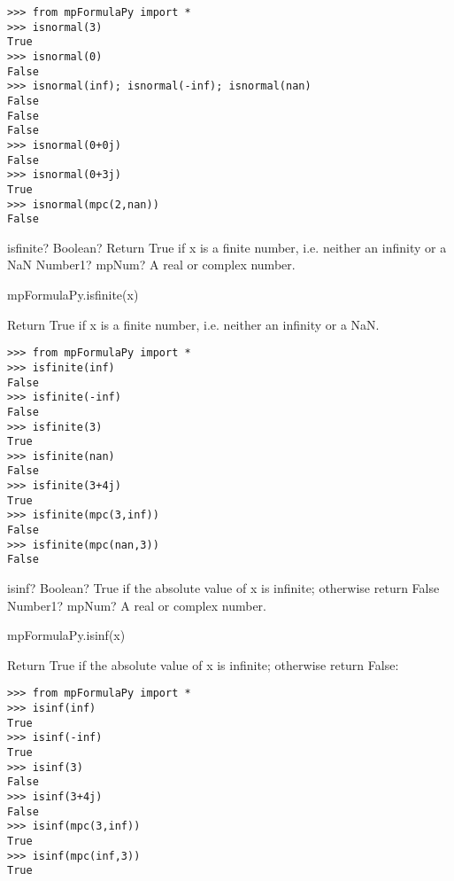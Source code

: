 \begin{lstlisting}
>>> from mpFormulaPy import *
>>> isnormal(3)
True
>>> isnormal(0)
False
>>> isnormal(inf); isnormal(-inf); isnormal(nan)
False
False
False
>>> isnormal(0+0j)
False
>>> isnormal(0+3j)
True
>>> isnormal(mpc(2,nan))
False
\end{lstlisting}





\begin{mpFunctionsExtract}
	\mpFunctionOne
	{isfinite? Boolean?  Return True if x is a finite number, i.e. neither an infinity or a NaN}
	{Number1? mpNum? A real or complex number.}
\end{mpFunctionsExtract}



mpFormulaPy.isfinite(x)

\vpara
Return True if x is a finite number, i.e. neither an infinity or a NaN.

\begin{lstlisting}
>>> from mpFormulaPy import *
>>> isfinite(inf)
False
>>> isfinite(-inf)
False
>>> isfinite(3)
True
>>> isfinite(nan)
False
>>> isfinite(3+4j)
True
>>> isfinite(mpc(3,inf))
False
>>> isfinite(mpc(nan,3))
False
\end{lstlisting}


\begin{mpFunctionsExtract}
	\mpFunctionOne
	{isinf? Boolean?  True if the absolute value of x is infinite; otherwise return False}
	{Number1? mpNum? A real or complex number.}
\end{mpFunctionsExtract}


mpFormulaPy.isinf(x)

\vpara
Return True if the absolute value of x is infinite; otherwise return False:

\begin{lstlisting}
>>> from mpFormulaPy import *
>>> isinf(inf)
True
>>> isinf(-inf)
True
>>> isinf(3)
False
>>> isinf(3+4j)
False
>>> isinf(mpc(3,inf))
True
>>> isinf(mpc(inf,3))
True
\end{lstlisting}





